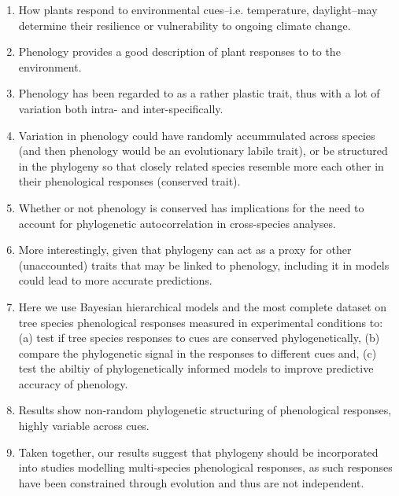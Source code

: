\documentclass{article}\usepackage[]{graphicx}\usepackage[]{color}
\begin{document}
\begin{enumerate}
\item How plants respond to environmental cues--i.e. temperature, daylight--may determine their resilience or vulnerability to ongoing climate change. 
\item Phenology provides a good description of plant responses to to the environment. 
\item Phenology has been regarded to as a rather plastic trait, thus with a lot of variation both intra- and inter-specifically.
\item Variation in phenology could have randomly accummulated across species (and then phenology would be an evolutionary labile trait), or be structured in the phylogeny so that closely related species resemble more each other in their phenological responses (conserved trait).
\item Whether or not phenology is conserved has implications for the need to account for phylogenetic autocorrelation in cross-species analyses.
\item More interestingly, given that phylogeny can act as a proxy for other (unaccounted) traits that may be linked to phenology, including it in models could lead to more accurate predictions.
\item Here we use Bayesian hierarchical models and the most complete dataset on tree species phenological responses measured in experimental conditions to: (a) test if tree species responses to cues are conserved phylogenetically, (b) compare the phylogenetic signal in the responses to different cues and, (c) test the abiltiy of phylogenetically informed models to improve predictive accuracy of phenology.
\item Results show non-random phylogenetic structuring of phenological responses, highly variable across cues.  
\item Taken together, our results suggest that phylogeny should be incorporated into studies modelling multi-species phenological responses, as such responses have been constrained through evolution and thus are not independent.  
\end{enumerate}



\end{document}
